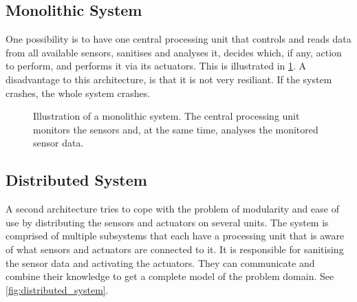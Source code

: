 \subsection{Monolithic System}
One possibility is to have one central processing unit that controls and reads data from all available sensors, sanitises and analyses it, decides which, if any, action to perform, and performs it via its actuators. This is illustrated in \cref{fig:monolithic_system}. A disadvantage to this architecture, is that it is not very resiliant. If the system crashes, the whole system crashes.

\begin{figure}[htbp]
\centering
{}
\caption[Monolithic system]{Illustration of a monolithic system. The central processing unit monitors the sensors and, at the same time, analyses the monitored sensor data.}\label{fig:monolithic_system}
\end{figure}


\subsection{Distributed System}
A second architecture tries to cope with the problem of modularity and ease of use by distributing the sensors and actuators on several units. The system is comprised of multiple subsystems that each have a processing unit that is aware of what sensors and actuators are connected to it. It is responsible for sanitising the sensor data and activating the actuators. They can communicate and combine their knowledge to get a complete model of the problem domain. See \cref{fig:distributed_system}.

